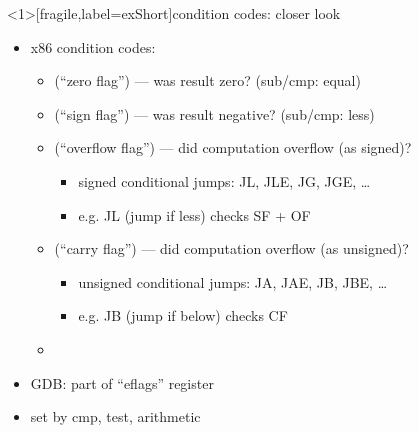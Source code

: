 \begin{frame}<1>[fragile,label=exShort]{condition codes: closer look}
\begin{itemize}
    \item x86 condition codes:
        \begin{itemize}
        \item \xZF (``zero flag'') --- was result zero? (sub/cmp: equal)
        \item \xSF (``sign flag'') --- was result negative? (sub/cmp: less)
        \item<2-> \xOF (``overflow flag'') --- did computation overflow (as signed)?
            \begin{itemize}
            \item<3-> signed conditional jumps: JL, JLE, JG, JGE, \ldots
            \item<3-> e.g. JL (jump if less) checks SF + OF
            \end{itemize}
        \item<2-> \xCF (``carry flag'') --- did computation overflow (as unsigned)?
            \begin{itemize}
            \item<3-> unsigned conditional jumps: JA, JAE, JB, JBE, \ldots
            \item<3-> e.g. JB (jump if below) checks CF
            \end{itemize}
        \item {}
        \end{itemize}
    \item GDB: part of ``eflags'' register
    \item set by cmp, test, arithmetic
\end{itemize}
\end{frame}



